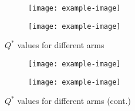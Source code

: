 \documentclass{article}
\begin{document}
\begin{figure}[htb]
    \centering
    \begin{subfigure}[b]{\textwidth}
        \texttt{[image: example-image]}
        \label{fig:arm1}
    \end{subfigure}
%
    \begin{subfigure}[b]{\textwidth}
        \texttt{[image: example-image]}
        \label{fig:arm2}
    \end{subfigure}
    \caption{$Q^{*}$ values for different arms}
\end{figure}
\begin{figure}[htb]\ContinuedFloat
    \centering
    \begin{subfigure}[b]{\textwidth}
        \texttt{[image: example-image]}
        \label{fig:arm3}
    \end{subfigure}
%
    \begin{subfigure}[b]{\textwidth}
        \texttt{[image: example-image]}
        \label{fig:arm4}
    \end{subfigure}
    \caption{$Q^{*}$ values for different arms (cont.)}
    \label{fig:arms}
\end{figure}
    
\end{document}

